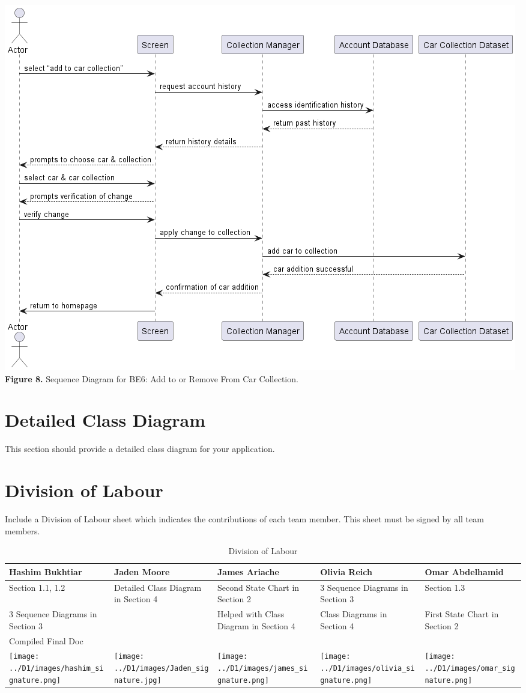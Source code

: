 \documentclass[]{article}
\begin{document}
\begin{center}
	\includegraphics[scale=0.55]{Sequence Diagrams/BE6_Sequence_Diagram.png}\\
	\textbf{Figure 8.} Sequence Diagram for BE6: Add to or Remove From Car Collection.\\
\end{center}

\section{Detailed Class Diagram}
\label{sec:detailed_class_diagram}
This section should provide a detailed class diagram for your application.

\appendix
\section{Division of Labour}
\label{sec:division_of_labour}
Include a Division of Labour sheet which indicates the contributions of each team member. This sheet must be signed by all team members.

\begin{table}[h!]
\centering
\begin{tabular}{|p{3.5cm}|p{3.5cm}|p{3cm}|p{3.5cm}|p{3cm}|}
\hline
Hashim Bukhtiar & Jaden Moore & James Ariache & Olivia Reich & Omar Abdelhamid \\ \hline
Section 1.1, 1.2 & Detailed Class Diagram in Section 4 & Second State Chart in Section 2 & 3 Sequence Diagrams in Section 3 & Section 1.3 \\ 
3 Sequence Diagrams in Section 3 &  & Helped with Class Diagram in Section 4 & Class Diagrams in Section 4 & First State Chart in Section 2 \\
Compiled Final Doc &  &  &  & \\

\texttt{[image: ../D1/images/hashim\_signature.png]} & \texttt{[image: ../D1/images/Jaden\_signature.jpg]} &
\texttt{[image: ../D1/images/james\_signature.png]}& \texttt{[image: ../D1/images/olivia\_signature.png]} & \texttt{[image: ../D1/images/omar\_signature.png]}  \\
\hline
\end{tabular}
\caption{Division of Labour} 
\label{tab:division_of_labour}
\end{table}
\end{document}
